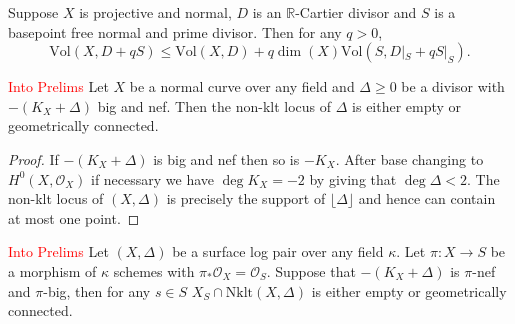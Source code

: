 \documentclass[a4paper,12pt]{book}
\newcommand{\D}{\Delta}
\newcommand{\Vol}{\text{Vol}}
\newcommand{\nklt}{\text{Nklt}}
\newcommand{\ox}{\mathcal{O}_{X}}
\newcommand\myworries[1]{\textcolor{red}{#1}}
\begin{document}
\begin{lemma}\label{vol}\cite[Lemma 2.5]{jiang2018birational}
	Suppose $X$ is projective and normal, $D$ is an $\mathbb{R}$-Cartier divisor and $S$ is a basepoint free normal and prime divisor. Then for any $q >0$,
	\[\Vol(X,D+qS) \leq \Vol(X,D) + q\dim(X)\Vol(S,D|_{S}+qS|_{S}).\]
\end{lemma}	

\begin{lemma}\myworries{Into Prelims}
	Let $X$ be a normal curve over any field and $\Delta \geq 0 $ be a divisor with $-(K_{X}+\Delta)$ big and nef. Then the non-klt locus of $\Delta$ is either empty or geometrically connected. 
\end{lemma}

\begin{proof}
	If $-(K_{X}+\Delta)$ is big and nef then so is $-K_{X}$. After base changing to $H^{0}(X,\ox)$ if necessary we have $\deg K_{X} = -2$ by \cite[Corollary 2.8]{tanaka2018minimal} giving that $ \deg \Delta <2$. The non-klt locus of $(X,\Delta)$ is precisely the support of $\lfloor \D \rfloor$ and hence can contain at most one point.
\end{proof}

\begin{theorem}\cite[Theorem 5.2]{tanaka2018minimal}\label{Tcl}\myworries{Into Prelims}
	Let $(X,\Delta)$ be a surface log pair over any field $\kappa$. Let $\pi\colon X \to S$ be a morphism of $\kappa$ schemes with $\pi_{*}\ox =\mathcal{O}_{S}$. Suppose that $-(K_{X}+\Delta)$ is $\pi$-nef and $\pi$-big, then for any $s \in S$ $X_{S}\cap \nklt(X,\Delta)$ is either empty or geometrically connected. 
\end{theorem}
\end{document}
